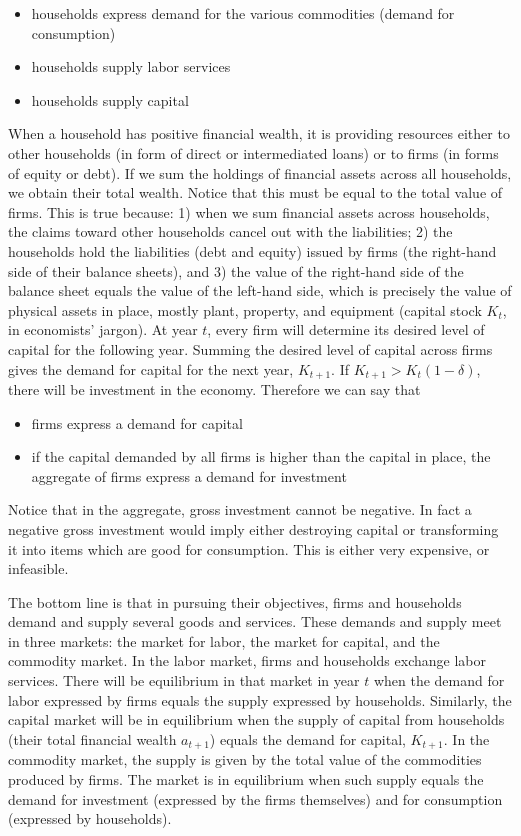 \documentclass[letterpaper,12pt]{article}
\begin{document}
\begin{itemize}
\item households express demand for the various commodities (demand for consumption)%
\item households supply labor services%
\item households supply capital%
\end{itemize}

When a household has positive financial wealth, it is providing
resources either to other households (in form of direct or
intermediated loans) or to firms (in forms of equity or debt). If
we sum the holdings of financial assets across all households, we
obtain their total wealth. Notice that this must be equal to the
total value of firms. This is true because: 1) when we sum
financial assets across households, the claims toward other
households cancel out with the liabilities; 2) the households hold
the liabilities (debt and equity) issued by firms (the right-hand
side of their balance sheets), and 3) the value of the right-hand
side of the balance sheet equals the value of the left-hand side,
which is precisely the value of physical assets in place, mostly
plant, property, and equipment (capital stock $K_{t}$, in
economists' jargon). At year $t$, every firm will determine its
desired level of capital for the following year. Summing the
desired level of capital across firms gives the demand for capital
for the next year, $K_{t+1}$. If $K_{t+1}>K_{t}(1-\delta)$, there
will be investment in the economy. Therefore we can say that

\begin{itemize}
\item firms express a demand for capital%
\item if the capital demanded by all firms is higher than the capital in place, the aggregate of firms express a demand for investment%
\end{itemize}

Notice that in the aggregate, gross investment cannot be negative.
In fact a negative gross investment would imply either destroying
capital or transforming it into items which are good for
consumption. This is either very expensive, or infeasible.

The bottom line is that in pursuing their objectives, firms and
households demand and supply several goods and services. These
demands and supply meet in three markets: the market for labor,
the market for capital, and the commodity market. In the labor
market, firms and households exchange labor services. There will
be equilibrium in that market in year $t$ when the demand for
labor expressed by firms equals the supply expressed by
households. Similarly, the capital market will be in equilibrium
when the supply of capital from households (their total financial
wealth $a_{t+1}$) equals the demand for capital, $K_{t+1}$. In the
commodity market, the supply is given by the total value of the
commodities produced by firms. The market is in equilibrium when
such supply equals the demand for investment (expressed by the
firms themselves) and for consumption (expressed by households).
\end{document}
